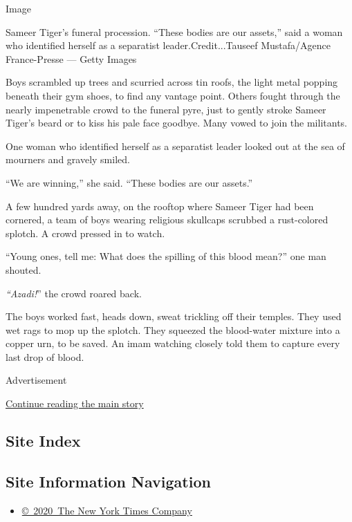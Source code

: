 Image

Sameer Tiger's funeral procession. ``These bodies are our assets,'' said
a woman who identified herself as a separatist leader.Credit...Tauseef
Mustafa/Agence France-Presse --- Getty Images

Boys scrambled up trees and scurried across tin roofs, the light metal
popping beneath their gym shoes, to find any vantage point. Others
fought through the nearly impenetrable crowd to the funeral pyre, just
to gently stroke Sameer Tiger's beard or to kiss his pale face goodbye.
Many vowed to join the militants.

One woman who identified herself as a separatist leader looked out at
the sea of mourners and gravely smiled.

``We are winning,'' she said. ``These bodies are our assets.''

A few hundred yards away, on the rooftop where Sameer Tiger had been
cornered, a team of boys wearing religious skullcaps scrubbed a
rust-colored splotch. A crowd pressed in to watch.

``Young ones, tell me: What does the spilling of this blood mean?'' one
man shouted.

\emph{``Azadi!}'' the crowd roared back.

The boys worked fast, heads down, sweat trickling off their temples.
They used wet rags to mop up the splotch. They squeezed the blood-water
mixture into a copper urn, to be saved. An imam watching closely told
them to capture every last drop of blood.

Advertisement

\protect\hyperlink{after-bottom}{Continue reading the main story}

\hypertarget{site-index}{%
\subsection{Site Index}\label{site-index}}

\hypertarget{site-information-navigation}{%
\subsection{Site Information
Navigation}\label{site-information-navigation}}

\begin{itemize}
\tightlist
\item
  \href{https://help.nytimes.com/hc/en-us/articles/115014792127-Copyright-notice}{©~2020~The
  New York Times Company}
\end{itemize}

